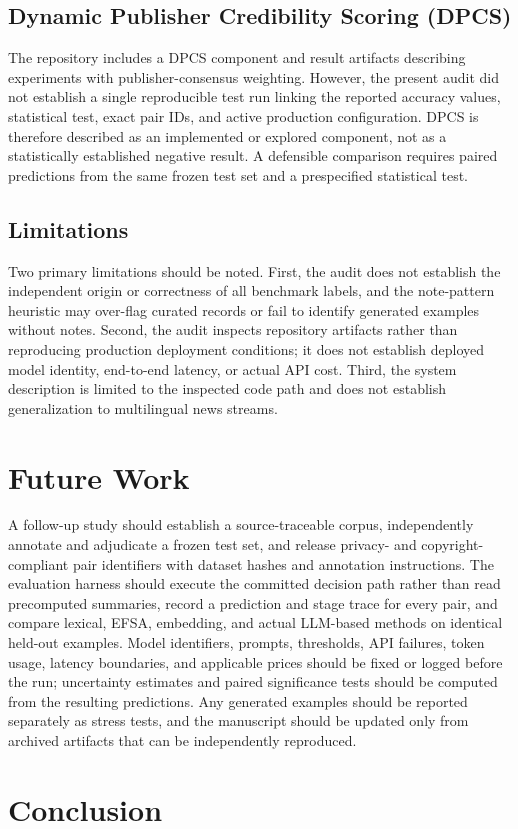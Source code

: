 \documentclass[sigconf,natbib=true,anonymous=true]{acmart}
\begin{document}
\subsection{Dynamic Publisher Credibility Scoring (DPCS)}
The repository includes a DPCS component and result artifacts describing experiments with publisher-consensus weighting. However, the present audit did not establish a single reproducible test run linking the reported accuracy values, statistical test, exact pair IDs, and active production configuration. DPCS is therefore described as an implemented or explored component, not as a statistically established negative result. A defensible comparison requires paired predictions from the same frozen test set and a prespecified statistical test.

\subsection{Limitations}
Two primary limitations should be noted.
First, the audit does not establish the independent origin or correctness of all benchmark labels, and the note-pattern heuristic may over-flag curated records or fail to identify generated examples without notes. Second, the audit inspects repository artifacts rather than reproducing production deployment conditions; it does not establish deployed model identity, end-to-end latency, or actual API cost. Third, the system description is limited to the inspected code path and does not establish generalization to multilingual news streams.

\section{Future Work}
A follow-up study should establish a source-traceable corpus, independently annotate and adjudicate a frozen test set, and release privacy- and copyright-compliant pair identifiers with dataset hashes and annotation instructions. The evaluation harness should execute the committed decision path rather than read precomputed summaries, record a prediction and stage trace for every pair, and compare lexical, EFSA, embedding, and actual LLM-based methods on identical held-out examples. Model identifiers, prompts, thresholds, API failures, token usage, latency boundaries, and applicable prices should be fixed or logged before the run; uncertainty estimates and paired significance tests should be computed from the resulting predictions. Any generated examples should be reported separately as stress tests, and the manuscript should be updated only from archived artifacts that can be independently reproduced.\n\n\section{Conclusion}
\end{document}
